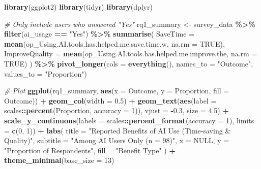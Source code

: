 \documentclass[
]{article}
\newenvironment{Shaded}{\begin{snugshade}}{\end{snugshade}}
\newcommand{\AttributeTok}[1]{\textcolor[rgb]{0.13,0.29,0.53}{#1}}
\newcommand{\CommentTok}[1]{\textcolor[rgb]{0.56,0.35,0.01}{\textit{#1}}}
\newcommand{\ConstantTok}[1]{\textcolor[rgb]{0.56,0.35,0.01}{#1}}
\newcommand{\DecValTok}[1]{\textcolor[rgb]{0.00,0.00,0.81}{#1}}
\newcommand{\FloatTok}[1]{\textcolor[rgb]{0.00,0.00,0.81}{#1}}
\newcommand{\FunctionTok}[1]{\textcolor[rgb]{0.13,0.29,0.53}{\textbf{#1}}}
\newcommand{\NormalTok}[1]{#1}
\newcommand{\OtherTok}[1]{\textcolor[rgb]{0.56,0.35,0.01}{#1}}
\newcommand{\SpecialCharTok}[1]{\textcolor[rgb]{0.81,0.36,0.00}{\textbf{#1}}}
\newcommand{\StringTok}[1]{\textcolor[rgb]{0.31,0.60,0.02}{#1}}
\begin{document}
\begin{Shaded}
\begin{Highlighting}[]
\FunctionTok{library}\NormalTok{(ggplot2)}
\FunctionTok{library}\NormalTok{(tidyr)}
\FunctionTok{library}\NormalTok{(dplyr)}

\CommentTok{\# Only include users who answered "Yes"}
\NormalTok{rq1\_summary }\OtherTok{\textless{}{-}}\NormalTok{ survey\_data }\SpecialCharTok{\%\textgreater{}\%}
  \FunctionTok{filter}\NormalTok{(ai\_usage }\SpecialCharTok{==} \StringTok{"Yes"}\NormalTok{) }\SpecialCharTok{\%\textgreater{}\%}
  \FunctionTok{summarise}\NormalTok{(}
    \AttributeTok{SaveTime =} \FunctionTok{mean}\NormalTok{(op\_Using.AI.tools.has.helped.me.save.time.w, }\AttributeTok{na.rm =} \ConstantTok{TRUE}\NormalTok{),}
    \AttributeTok{ImproveQuality =} \FunctionTok{mean}\NormalTok{(op\_Using.AI.tools.has.helped.me.improve.the, }\AttributeTok{na.rm =} \ConstantTok{TRUE}\NormalTok{)}
\NormalTok{  ) }\SpecialCharTok{\%\textgreater{}\%}
  \FunctionTok{pivot\_longer}\NormalTok{(}\AttributeTok{cols =} \FunctionTok{everything}\NormalTok{(), }\AttributeTok{names\_to =} \StringTok{"Outcome"}\NormalTok{, }\AttributeTok{values\_to =} \StringTok{"Proportion"}\NormalTok{)}

\CommentTok{\# Plot}
\FunctionTok{ggplot}\NormalTok{(rq1\_summary, }\FunctionTok{aes}\NormalTok{(}\AttributeTok{x =}\NormalTok{ Outcome, }\AttributeTok{y =}\NormalTok{ Proportion, }\AttributeTok{fill =}\NormalTok{ Outcome)) }\SpecialCharTok{+}
  \FunctionTok{geom\_col}\NormalTok{(}\AttributeTok{width =} \FloatTok{0.5}\NormalTok{) }\SpecialCharTok{+}
  \FunctionTok{geom\_text}\NormalTok{(}\FunctionTok{aes}\NormalTok{(}\AttributeTok{label =}\NormalTok{ scales}\SpecialCharTok{::}\FunctionTok{percent}\NormalTok{(Proportion, }\AttributeTok{accuracy =} \DecValTok{1}\NormalTok{)),}
            \AttributeTok{vjust =} \SpecialCharTok{{-}}\FloatTok{0.3}\NormalTok{, }\AttributeTok{size =} \FloatTok{4.5}\NormalTok{) }\SpecialCharTok{+}
  \FunctionTok{scale\_y\_continuous}\NormalTok{(}\AttributeTok{labels =}\NormalTok{ scales}\SpecialCharTok{::}\FunctionTok{percent\_format}\NormalTok{(}\AttributeTok{accuracy =} \DecValTok{1}\NormalTok{), }\AttributeTok{limits =} \FunctionTok{c}\NormalTok{(}\DecValTok{0}\NormalTok{, }\DecValTok{1}\NormalTok{)) }\SpecialCharTok{+}
  \FunctionTok{labs}\NormalTok{(}
    \AttributeTok{title =} \StringTok{"Reported Benefits of AI Use (Time{-}saving \& Quality)"}\NormalTok{,}
    \AttributeTok{subtitle =} \StringTok{"Among AI Users Only (n = 98)"}\NormalTok{,}
    \AttributeTok{x =} \ConstantTok{NULL}\NormalTok{,}
    \AttributeTok{y =} \StringTok{"Proportion of Respondents"}\NormalTok{,}
    \AttributeTok{fill =} \StringTok{"Benefit Type"}
\NormalTok{  ) }\SpecialCharTok{+}
  \FunctionTok{theme\_minimal}\NormalTok{(}\AttributeTok{base\_size =} \DecValTok{13}\NormalTok{)}
\end{Highlighting}
\end{Shaded}
\end{document}
